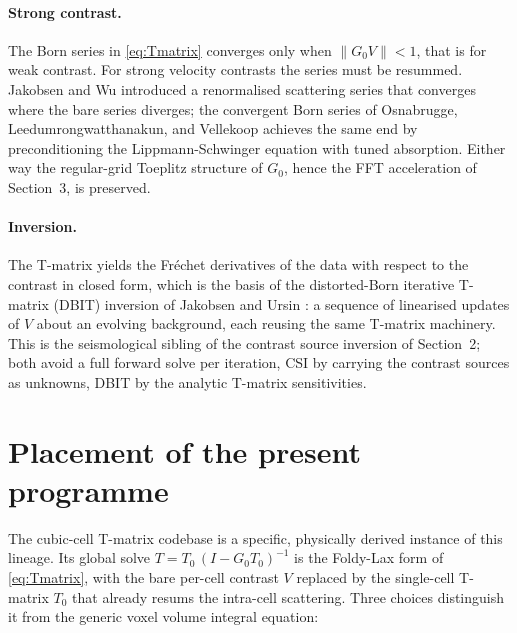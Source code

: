 \documentclass[11pt,a4paper]{article}
\newcommand{\norm}[1]{\lVert #1 \rVert}
\begin{document}
\paragraph{Strong contrast.} The Born series in \eqref{eq:Tmatrix} converges only when
$\norm{G_0 V}<1$, that is for weak contrast. For strong velocity contrasts the series must be
resummed. Jakobsen and Wu \cite{JakobsenWu2016} introduced a renormalised scattering series
that converges where the bare series diverges; the convergent Born series of Osnabrugge,
Leedumrongwatthanakun, and Vellekoop \cite{Osnabrugge2016} achieves the same end by
preconditioning the Lippmann-Schwinger equation with tuned absorption. Either way the
regular-grid Toeplitz structure of $G_0$, hence the FFT acceleration of Section~3, is preserved.

\paragraph{Inversion.} The T-matrix yields the Fr\'echet derivatives of the data with respect
to the contrast in closed form, which is the basis of the distorted-Born iterative T-matrix
(DBIT) inversion of Jakobsen and Ursin \cite{JakobsenUrsin2015}: a sequence of linearised
updates of $V$ about an evolving background, each reusing the same T-matrix machinery. This is
the seismological sibling of the contrast source inversion of Section~2; both avoid a full
forward solve per iteration, CSI by carrying the contrast sources as unknowns, DBIT by the
analytic T-matrix sensitivities.

\section{Placement of the present programme}

The cubic-cell T-matrix codebase is a specific, physically derived instance of this lineage.
Its global solve $T=T_0\,(I-G_0 T_0)^{-1}$ is the Foldy-Lax form of \eqref{eq:Tmatrix}, with the
bare per-cell contrast $V$ replaced by the single-cell T-matrix $T_0$ that already resums the
intra-cell scattering. Three choices distinguish it from the generic voxel volume integral
equation:
\end{document}
